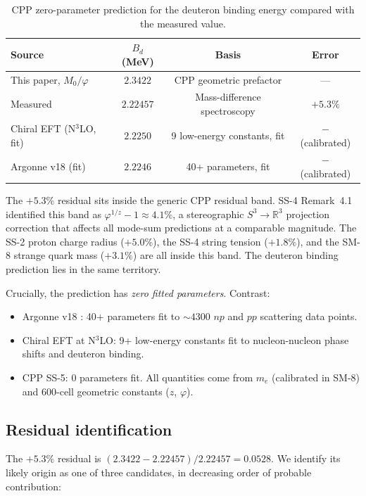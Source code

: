\documentclass[11pt,letterpaper]{article}
\newcommand{\phig}{\varphi}
\newcommand{\Mzero}{M_0}
\newcommand{\Bd}{B_{d}}
\begin{document}
\begin{table}[H]
\centering
\caption{CPP zero-parameter prediction for the deuteron binding energy compared with the measured value.}
\label{tab:Bd_compare}
\begin{tabular}{@{}lccc@{}}
\toprule
Source & $\Bd$ (MeV) & Basis & Error \\
\midrule
This paper, $\Mzero/\phig$ & $\mathbf{2.3422}$ & CPP geometric prefactor & --- \\
Measured \citep{pdg2024} & $2.22457$ & Mass-difference spectroscopy & $+5.3\%$ \\
Chiral EFT (N$^3$LO, fit) & $2.2250$ & 9 low-energy constants, fit & $-$ (calibrated) \\
Argonne v18 (fit) & $2.2246$ & 40+ parameters, fit & $-$ (calibrated) \\
\bottomrule
\end{tabular}
\end{table}

The $+5.3\%$ residual sits inside the generic CPP residual band. SS-4 Remark~4.1 identified this band as $\phig^{1/z} - 1 \approx 4.1\%$, a stereographic $S^3 \to \mathbb{R}^3$ projection correction that affects all mode-sum predictions at a comparable magnitude. The SS-2 proton charge radius ($+5.0\%$), the SS-4 string tension ($+1.8\%$), and the SM-8 strange quark mass ($+3.1\%$) are all inside this band. The deuteron binding prediction lies in the same territory.

Crucially, the prediction has \emph{zero fitted parameters}. Contrast:
\begin{itemize}
\item Argonne v18 \citep{argonne_v18}: 40+ parameters fit to $\sim 4300$ $np$ and $pp$ scattering data points.
\item Chiral EFT at N$^3$LO: 9+ low-energy constants fit to nucleon-nucleon phase shifts and deuteron binding.
\item CPP SS-5: 0 parameters fit. All quantities come from $m_e$ (calibrated in SM-8) and 600-cell geometric constants ($z$, $\phig$).
\end{itemize}

\subsection{Residual identification}
\label{sec:residual}

The $+5.3\%$ residual is $(2.3422 - 2.22457)/2.22457 = 0.0528$. We identify its likely origin as one of three candidates, in decreasing order of probable contribution:
\end{document}
